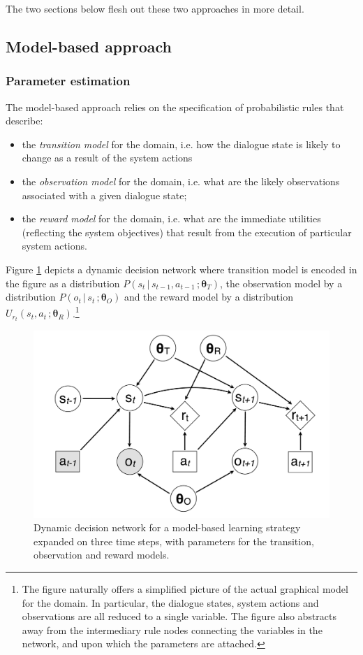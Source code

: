 The two sections below flesh out these two approaches in more detail. 

\subsection{Model-based approach}

\subsubsection*{Parameter estimation}

The model-based approach relies on the specification of probabilistic rules that describe:
\begin{itemize}
\item the \textit{transition model} for the domain, i.e. how the dialogue state is likely to change as a result of the system actions
\item the \textit{observation model} for the domain, i.e. what are the likely observations associated with a given dialogue state;
\item the \textit{reward model} for the domain, i.e. what are the immediate utilities (reflecting the system objectives) that result from the execution of particular system actions.
\end{itemize}

Figure \ref{fig:modelbasediagram} depicts a dynamic decision network where transition model is encoded in the figure as a distribution $P(s_t \, | \, s_{t-1}, a_{t-1} \,; \boldsymbol\theta_T)$, the observation model by a distribution $P(o_t \, | \, s_t\,; \boldsymbol\theta_O)$ and the reward model by a distribution $U_{r_t}(s_t,a_t\,; \boldsymbol\theta_R)$.\footnote{The figure naturally offers a simplified picture of the actual graphical model for the domain. In particular, the dialogue states, system actions and observations are all reduced to a single variable.  The figure also abstracts away from the intermediary rule nodes connecting the variables in the network, and upon which the parameters are attached.}

\begin{figure}[h]
\centering
\includegraphics[scale=0.25]{imgs/modelbaseddiagram.pdf}
\caption{Dynamic decision network for a model-based learning strategy expanded on three time steps, with parameters for the transition, observation and reward models.}
\label{fig:modelbasediagram}
\end{figure}

